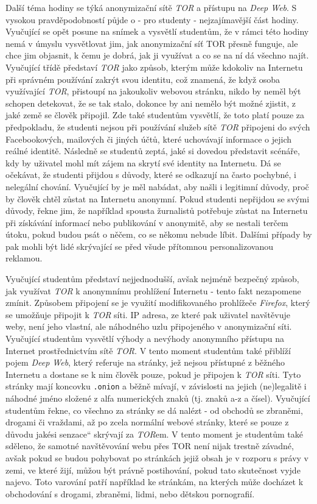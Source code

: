 \documentclass[a4paper, 12pt]{article}
\providecommand{\uv}[1]{\quotedblbase #1\textquotedblleft}
\begin{document}
Další téma hodiny se týká anonymizační sítě \textit{TOR} a přístupu na \textit{Deep Web}. S vysokou pravděpodobností půjde o - pro studenty - nejzajímavější část hodiny. Vyučující se opět posune na snímek a vysvětlí studentům, že v rámci této hodiny nemá v úmyslu vysvětlovat jim, jak anonymizační síť TOR přesně funguje, ale chce jim objasnit, k čemu je dobrá, jak ji využívat a co se na ní dá všechno najít. Vyučující třídě představí \textit{TOR} jako způsob, kterým může kdokoliv na Internetu při správném používání zakrýt svou identitu, což znamená, že když osoba využívající \textit{TOR}, přistoupí na jakoukoliv webovou stránku, nikdo by neměl být schopen detekovat, že se tak stalo, dokonce by ani nemělo být možné zjistit, z jaké země se člověk připojil. Zde také studentům vysvětlí, že toto platí pouze za předpokladu, že studenti nejsou při používání služeb sítě \textit{TOR} připojeni do svých Facebookových, mailových či jiných účtů, které uchovávají informace o jejich reálné identitě. Následně se studentů zeptá, jaké si dovedou představit scénáře, kdy by uživatel mohl mít zájem na skrytí své identity na Internetu. Dá se očekávat, že studenti přijdou s důvody, které se odkazují na často pochybné, i nelegální chování. Vyučující by je měl nabádat, aby našli i legitimní důvody, proč by člověk chtěl zůstat na Internetu anonymní. Pokud studenti nepřijdou se svými důvody, řekne jim, že například spousta žurnalistů potřebuje zůstat na Internetu při získávání informací nebo publikování v anonymitě, aby se nestali terčem útoku, pokud budou psát o něčem, co se někomu nebude líbit. Dalšími případy by pak mohli být lidé skrývající se před všude přítomnou personalizovanou reklamou.

Vyučující studentům představí nejjednodušší, avšak nejméně bezpečný způsob, jak využívat \textit{TOR} k anonymnímu prohlížení Internetu - tento fakt nezapomene zmínit. Způsobem připojení se je využití modifikovaného prohlížeče \textit{Firefox}, který se umožňuje připojit k \textit{TOR} síti. IP adresa, ze které pak uživatel navštěvuje weby, není jeho vlastní, ale náhodného uzlu připojeného v anonymizační síti. Vyučující studentům vysvětlí výhody a nevýhody anonymního přístupu na Internet prostřednictvím sítě \textit{TOR}. V tento moment studentům také přiblíží pojem \textit{Deep Web}, který referuje na stránky, jež nejsou přístupné z běžného Internetu a dostane se k nim člověk pouze, pokud je připojen k \textit{TOR} síti. Tyto stránky mají koncovku \texttt{.onion} a běžně mívají, v závislosti na jejich (ne)legalitě i náhodné jméno složené z alfa numerických znaků (tj. znaků a-z a čísel). Vyučující studentům řekne, co všechno za stránky se dá nalézt - od obchodů se zbraněmi, drogami či vraždami, až po zcela normální webové stránky, které se pouze z důvodu jakési \uv{senzace} skrývají za \textit{TOR}em. V tento moment je studentům také sděleno, že samotné navštěvování webu přes TOR není nijak trestně závadné, avšak pokud se budou pohybovat po stránkách jejiž obsah je v rozporu s právy v zemi, ve které žijí, můžou být právně postihování, pokud tato skutečnost vyjde najevo. Toto varování patří například ke stránkám, na kterých může docházet k obchodování s drogami, zbraněmi, lidmi, nebo dětskou pornografií.
\end{document}
